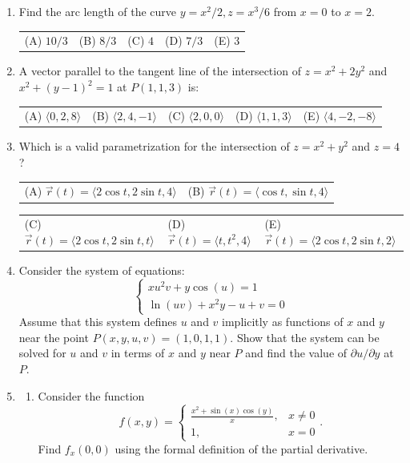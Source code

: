 \documentclass[a4paper, 12pt]{article}
\begin{document}
\begin{enumerate}[leftmargin=*,label=\textbf{\arabic*.}]
\item Find the arc length of the curve $y = x^2/2, z = x^3/6$ from $x = 0$ to $x = 2$.
\begin{center}
\begin{tabular}{lllll}
(A) $10/3$ &
(B) $8/3$ &
(C) $4$ &
(D) $7/3$ &
(E) $3$
\end{tabular}
\end{center}

\newpage
\item A vector parallel to the tangent line of the intersection of $z = x^2 + 2y^2$ and $x^2 + (y-1)^2 = 1$ at $P(1,1,3)$ is:
\begin{center}
\begin{tabular}{lllll}
(A) $\langle 0, 2, 8 \rangle$ &
(B) $\langle 2, 4, -1 \rangle$ &
(C) $\langle 2, 0, 0 \rangle$ &
(D) $\langle 1, 1, 3 \rangle$ &
(E) $\langle 4, -2, -8 \rangle$
\end{tabular}
\end{center}

\item Which is a valid parametrization for the intersection of $z = x^2 + y^2$ and $z = 4$?
\begin{center}
\begin{tabular}{ll}
(A) $\vec{r}(t) = \langle 2\cos t, 2\sin t, 4 \rangle$ &
(B) $\vec{r}(t) = \langle \cos t, \sin t, 4 \rangle$
\end{tabular}

\begin{tabular}{lll}
(C) $\vec{r}(t) = \langle 2\cos t, 2\sin t, t \rangle$ &
(D) $\vec{r}(t) = \langle t, t^2, 4 \rangle$ &
(E) $\vec{r}(t) = \langle 2\cos t, 2\sin t, 2 \rangle$
\end{tabular}
\end{center}

\item Consider the system of equations:
\[
\begin{cases}
xu^2v + y\cos(u) = 1 \\
\ln(uv) + x^2y - u + v = 0
\end{cases}
\]
Assume that this system defines $u$ and $v$ implicitly as functions of $x$ and $y$ near the point $P(x,y,u,v) = (1,0,1,1)$.
Show that the system can be solved for $u$ and $v$ in terms of $x$ and $y$ near $P$ and find the value of $\partial u / \partial y$ at $P$.

\item \begin{enumerate}[label=\textbf{\alph*.}]
\item Consider the function
\[f(x,y) = \begin{cases}
\frac{x^2 + \sin(x)\cos(y)}{x}, & x \neq 0 \\ 
1, & x = 0 
\end{cases}.\]
Find $f_x(0,0)$ using the formal definition of the partial derivative.
    

\end{enumerate}
\end{enumerate}
\end{document}
